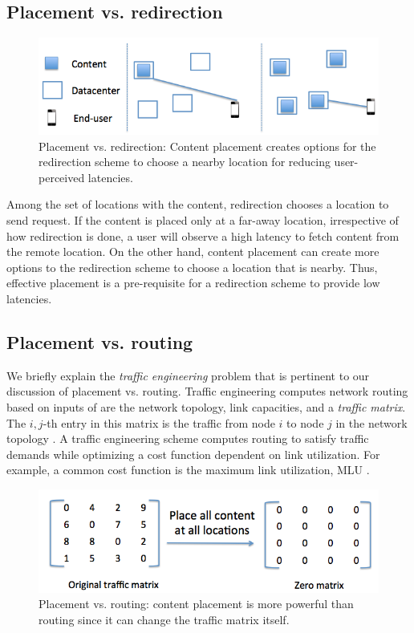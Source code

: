 \subsection{Placement vs. redirection}

\begin{figure}
	\centering
	\includegraphics[scale=0.5]{fig/placement-vs-redirection.png}
	\caption{Placement vs. redirection: Content placement creates options for the redirection scheme to choose a nearby location for reducing user-perceived latencies.}	
	\label{fig:placement-redirection}
\end{figure}

Among the set of locations with the content, redirection chooses a location to send request. If the content is placed only at a far-away location, irrespective of how redirection is done, a user will observe a high latency to fetch content from the remote location. On the other hand, content placement can create more options to the redirection scheme to choose a location that is nearby. Thus, effective placement is a pre-requisite for a redirection scheme to provide low latencies.


\subsection{Placement vs. routing}

We briefly explain the \emph{traffic engineering} problem that is pertinent to our discussion of placement vs. routing. Traffic engineering computes network routing based on inputs of are the network topology, link capacities, and a \emph{traffic matrix}. The $i,j$-th entry in this matrix is the traffic from node $i$ to node $j$ in the network topology \cite{fortz2000internet}. A traffic engineering scheme computes routing to satisfy traffic demands while optimizing a cost function dependent on link utilization. For example, a common cost function is the maximum link utilization, MLU \cite{rexford}. 

\begin{figure}
	\centering
	\includegraphics[scale=0.4]{fig/placement-vs-routing.png}
	\caption{Placement vs. routing: content placement is more powerful than routing since it can change the  traffic matrix itself.}
	\label{fig:placement-routing}
\end{figure}

